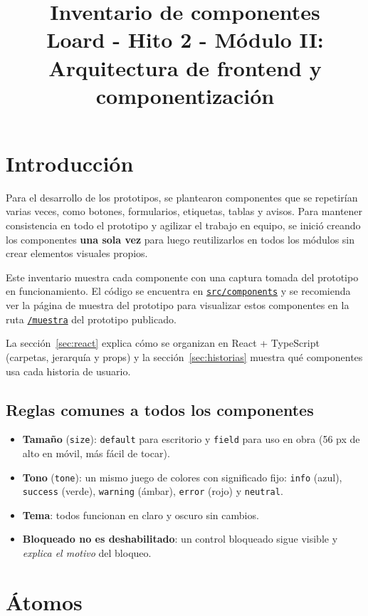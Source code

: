 \documentclass[11pt]{article}
\title{Inventario de componentes\\[0.3em]
\large Loard - Hito 2 - Módulo II: Arquitectura de frontend y componentización}
\author{}
\date{}
\newcommand{\urlapp}{https://thankstochatgpt.github.io/LOARD}
\newcommand{\app}[1]{\href{\urlapp#1}{\texttt{#1}}}
\newcommand{\codigo}[1]{\href{https://github.com/ThanksToChatGPT/LOARD/tree/main/Hito\%202/Modulo-I-Prototipo/prototipo/src/#1}{\texttt{src/#1}}}
\newcommand{\prop}[1]{\texttt{#1}}
\begin{document}
\maketitle

\section{Introducción}

Para el desarrollo de los prototipos, se plantearon componentes que se repetirían varias veces, como botones, formularios, etiquetas, tablas y avisos. Para mantener consistencia en todo el prototipo y agilizar el trabajo en equipo, se inició creando los componentes \textbf{una sola vez} para luego reutilizarlos en todos los módulos sin crear elementos visuales propios.

Este inventario muestra cada componente con una captura tomada del prototipo en funcionamiento. El código se encuentra en \codigo{components} y se recomienda ver la página de muestra del prototipo para visualizar estos componentes
en la ruta \app{/muestra} del prototipo publicado.

La sección~\ref{sec:react} explica cómo se organizan en React + TypeScript (carpetas, jerarquía y props) y la sección~\ref{sec:historias} muestra qué componentes usa cada historia de usuario.


\subsection*{Reglas comunes a todos los componentes}

\begin{itemize}
  \item \textbf{Tamaño} (\prop{size}): \prop{default} para escritorio y \prop{field} para uso en obra (56 px de alto en móvil, más fácil de tocar).
  \item \textbf{Tono} (\prop{tone}): un mismo juego de colores con significado fijo: \prop{info} (azul), \prop{success} (verde), \prop{warning} (ámbar), \prop{error} (rojo) y \prop{neutral}.
  \item \textbf{Tema}: todos funcionan en claro y oscuro sin cambios.
  \item \textbf{Bloqueado no es deshabilitado}: un control bloqueado sigue visible y \emph{explica el motivo} del bloqueo.
\end{itemize}

\newpage
\section{Átomos}
\end{document}
